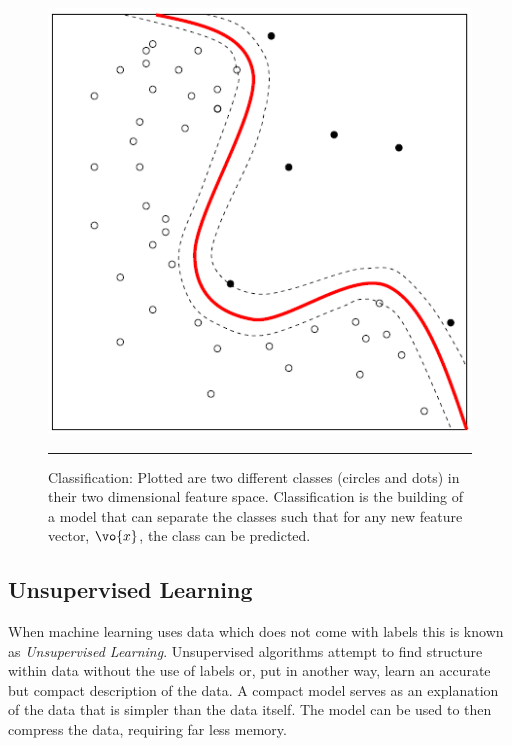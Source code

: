 
\begin{figure}[htbp]
	\centering
		\includegraphics{./Figures/classification.png}
		\rule{35em}{0.5pt}
	\caption[Classification]{Classification: Plotted are two different classes (circles and dots) in their two dimensional feature space. Classification is the building of a model that can separate the classes such that for any new feature vector, $\vo{x}$, the class can be predicted.}
	\label{fig:classification}
\end{figure}

	\subsection{Unsupervised Learning}
    
When machine learning uses data which does not come with labels this is known as \textit{Unsupervised Learning}.
Unsupervised algorithms attempt to find structure within data without the use of labels or, put in another way, learn an accurate but compact description of the data\citep{barber2012bayesian}. 
A compact model serves as an explanation of the data that is simpler than the data itself.
The model can be used to then compress the data, requiring far less memory.

